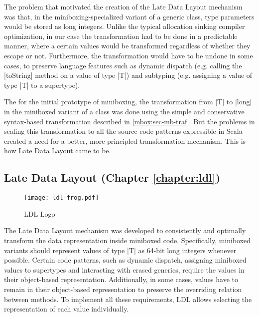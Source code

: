 The problem that motivated the creation of the Late Data Layout mechanism was that, in the miniboxing-specialized variant of a generic class, type parameters would be stored as long integers. Unlike the typical allocation sinking compiler optimization, in our case the transformation had to be done in a predictable manner, where a certain values would be transformed regardless of whether they escape or not. Furthermore, the transformation would have to be undone in some cases, to preserve language features such as dynamic dispatch (e.g. calling the |toString| method on a value of type |T|) and subtyping (e.g. assigning a value of type |T| to a supertype).

The for the initial prototype of miniboxing, the transformation from |T| to |long| in the miniboxed variant of a class was done using the simple and conservative syntax-based transformation described in \ref{mbox:sec-mb-traf}. But the problems in scaling this transformation to all the source code patterns expressible in Scala created a need for a better, more principled transformation mechanism. This is how Late Data Layout came to be.

\newpage

\subsection{Late Data Layout (Chapter \ref{chapter:ldl})}

\begin{wrapfigure}{r}{40mm}
  \centering
  \vspace{-2em}
  \texttt{[image: ldl-frog.pdf]}
  \vspace{-1em}
  \caption{LDL Logo}
  \vspace{-2em}
\end{wrapfigure}

The Late Data Layout mechanism was developed to consistently and optimally transform the data representation inside miniboxed code. Specifically, miniboxed variants should represent values of type |T| as 64-bit long integers whenever possible. Certain code patterns, such as dynamic dispatch, assigning miniboxed values to supertypes and interacting with erased generics, require the values in their object-based representation. Additionally, in some cases, values have to remain in their object-based representation to preserve the overriding relation between methods. To implement all these requirements, LDL allows selecting the representation of each value individually.

